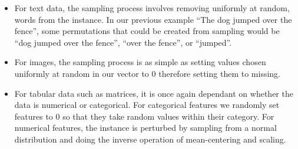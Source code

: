 \begin{itemize}
\item For text data, the sampling process involves removing uniformly at random, words from the instance. In our previous example ``The dog jumped over the fence'', some permutations that could be created from sampling would be ``dog jumped over the fence'', ``over the fence'', or ``jumped''.

\item For images, the sampling process is as simple as setting  values chosen uniformly at random in our vector to 0 therefore setting them to missing.

\item For tabular data such as matrices, it is once again dependant on whether the data is numerical or categorical. For categorical features we randomly set features to 0 so that they take random values within their category. For numerical features, the instance is perturbed by sampling from a normal distribution and doing the inverse operation of mean-centering and scaling.
\end{itemize}



